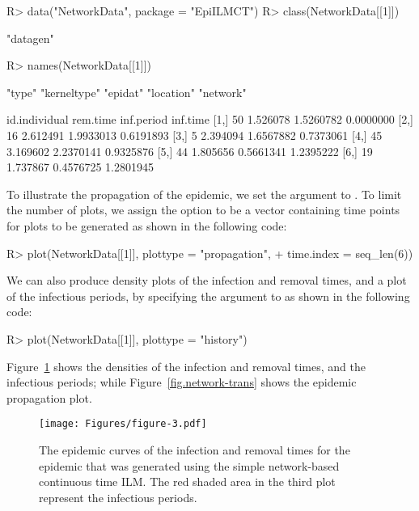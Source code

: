 \documentclass[nojss,shortnames]{jss}
\begin{document}
\begin{Sinput}
R> data("NetworkData", package = "EpiILMCT")
R> class(NetworkData[[1]])
\end{Sinput}
\begin{Soutput}
[1] "datagen"
\end{Soutput}
\begin{Sinput}
R> names(NetworkData[[1]])
\end{Sinput}
\begin{Soutput}
[1] "type"       "kerneltype" "epidat"     "location"   "network"   
\end{Soutput}
\begin{Soutput}
     id.individual rem.time inf.period  inf.time
[1,]            50 1.526078  1.5260782 0.0000000
[2,]            16 2.612491  1.9933013 0.6191893
[3,]             5 2.394094  1.6567882 0.7373061
[4,]            45 3.169602  2.2370141 0.9325876
[5,]            44 1.805656  0.5661341 1.2395222
[6,]            19 1.737867  0.4576725 1.2801945
\end{Soutput}

To illustrate the propagation of the epidemic, we set the argument  to . To limit the number of plots, we assign the  option to be a vector containing time points for plots to be generated as shown in the following code:

\begin{Sinput}
R> plot(NetworkData[[1]], plottype = "propagation", 
+    time.index = seq_len(6))
\end{Sinput}

We can also produce density plots of the infection and removal times, and a plot of the infectious periods, by specifying the argument  to  as shown in the following code:

\begin{Sinput}
R> plot(NetworkData[[1]], plottype = "history")
\end{Sinput}

Figure~\ref{fig.network-history} shows the densities of the infection and removal times, and the infectious periods; while Figure~\ref{fig.network-trans} shows the epidemic propagation plot.


\begin{figure}[!h]
\begin{center}
\texttt{[image: Figures/figure-3.pdf]}
\caption{The epidemic curves of the infection and removal times for the epidemic that was generated using the simple network-based continuous time ILM. The red shaded area in the third plot represent the infectious periods.}
\label{fig.network-history}
\end{center}
\end{figure}
\end{document}
